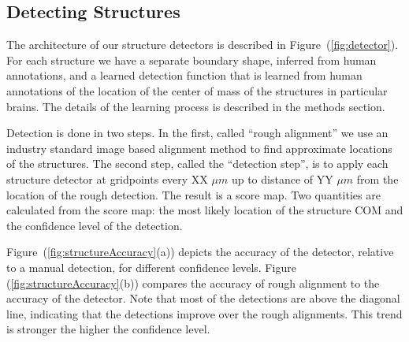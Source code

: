 \documentclass[11pt]{article}
\begin{document}
\subsection{Detecting Structures}
The architecture of our structure detectors is described in
Figure~(\ref{fig:detector}). For each structure we have a separate
boundary shape, inferred from human annotations, and a learned
detection function that is learned from human annotations of the
location of the center of mass of the structures in particular
brains. The details of the learning process is described in the
methods section.

Detection is done in two steps. In the first, called ``rough
alignment'' we use an industry standard image based alignment method
to find approximate locations of the structures. The second step,
called the ``detection step'', is to apply each structure detector
at gridpoints every XX $\mu m$ up to distance of YY $\mu m $ from the
location of the rough detection. The result is a score map. Two
quantities are calculated from the score map: the most likely location
of the structure COM and the confidence level of the detection.

Figure~(\ref{fig:structureAccuracy}(a)) depicts the accuracy of the
detector, relative to a manual detection, for different confidence
levels. Figure (\ref{fig:structureAccuracy}(b)) compares the accuracy
of rough alignment to the accuracy of the detector. Note that most of
the detections are above the diagonal line, indicating that the
detections improve over the rough alignments. This trend is stronger
the higher the confidence level.
\end{document}
